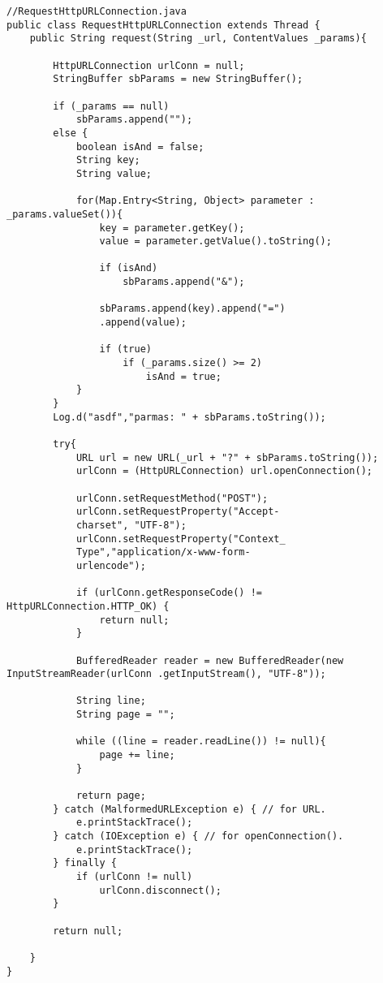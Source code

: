 \documentclass[conference]{IEEEtran}
\begin{document}
\begin{lstlisting}
//RequestHttpURLConnection.java
public class RequestHttpURLConnection extends Thread {
    public String request(String _url, ContentValues _params){

        HttpURLConnection urlConn = null;
        StringBuffer sbParams = new StringBuffer();

        if (_params == null)
            sbParams.append("");
        else {
            boolean isAnd = false;
            String key;
            String value;

            for(Map.Entry<String, Object> parameter : _params.valueSet()){
                key = parameter.getKey();
                value = parameter.getValue().toString();

                if (isAnd)
                    sbParams.append("&");

                sbParams.append(key).append("=")
                .append(value);

                if (true)
                    if (_params.size() >= 2)
                        isAnd = true;
            }
        }
        Log.d("asdf","parmas: " + sbParams.toString());

        try{
            URL url = new URL(_url + "?" + sbParams.toString());
            urlConn = (HttpURLConnection) url.openConnection();

            urlConn.setRequestMethod("POST"); 
            urlConn.setRequestProperty("Accept-
            charset", "UTF-8");
            urlConn.setRequestProperty("Context_
            Type","application/x-www-form-
            urlencode");

            if (urlConn.getResponseCode() != HttpURLConnection.HTTP_OK) {
                return null;
            }

            BufferedReader reader = new BufferedReader(new InputStreamReader(urlConn .getInputStream(), "UTF-8"));

            String line;
            String page = "";

            while ((line = reader.readLine()) != null){
                page += line;
            }

            return page;
        } catch (MalformedURLException e) { // for URL.
            e.printStackTrace();
        } catch (IOException e) { // for openConnection().
            e.printStackTrace();
        } finally {
            if (urlConn != null)
                urlConn.disconnect();
        }

        return null;

    }
}
\end{lstlisting}
\end{document}
